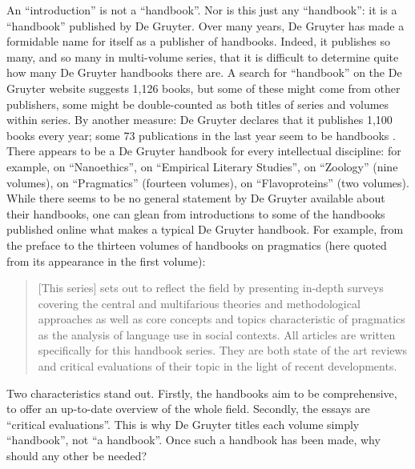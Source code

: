 \documentclass{article}
\begin{document}
An ``introduction'' is not a ``handbook''. Nor is this just any
``handbook'': it is a ``handbook'' published by De Gruyter. Over many
years, De Gruyter has made a formidable name for itself as a publisher
of handbooks. Indeed, it publishes so many, and so many in multi-volume
series, that it is difficult to determine quite how many De Gruyter
handbooks there are. A search for ``handbook'' on the De Gruyter website
suggests 1,126 books, but some of these might come from other
publishers, some might be double-counted as both titles of series and
volumes within series. By another measure: De Gruyter declares that it
publishes 1,100 books every year; some 73 publications in the last year
seem to be handbooks \parencite{noauthor_publication_2022}. There appears to be a De Gruyter
handbook for every intellectual discipline: for example, on
``Nanoethics'', on ``Empirical Literary Studies'', on ``Zoology'' (nine
volumes), on ``Pragmatics'' (fourteen volumes), on ``Flavoproteins''
(two volumes). While there seems to be no general statement by De
Gruyter available about their handbooks, one can glean from
introductions to some of the handbooks published online what makes a
typical De Gruyter handbook. For example, from the preface to the
thirteen volumes of handbooks on pragmatics (here quoted from its
appearance in the first volume):

\begin{quote}
{[}This series{]} sets out to reflect the field by presenting in-depth
surveys covering the central and multifarious theories and
methodological approaches as well as core concepts and topics
characteristic of pragmatics as the analysis of language use in social
contexts. All articles are written specifically for this handbook
series. They are both state of the art reviews and critical evaluations
of their topic in the light of recent developments.

\begin{flushright}
    \parencite[v]{bublitz_foundations_2011}
\end{flushright}
\end{quote}

\noindent Two characteristics stand out. Firstly, the handbooks aim to be
comprehensive, to offer an up-to-date overview of the whole field.
Secondly, the essays are ``critical evaluations''. This is why De
Gruyter titles each volume simply ``handbook'', not ``a handbook''. Once
such a handbook has been made, why should any other be needed?
\end{document}
